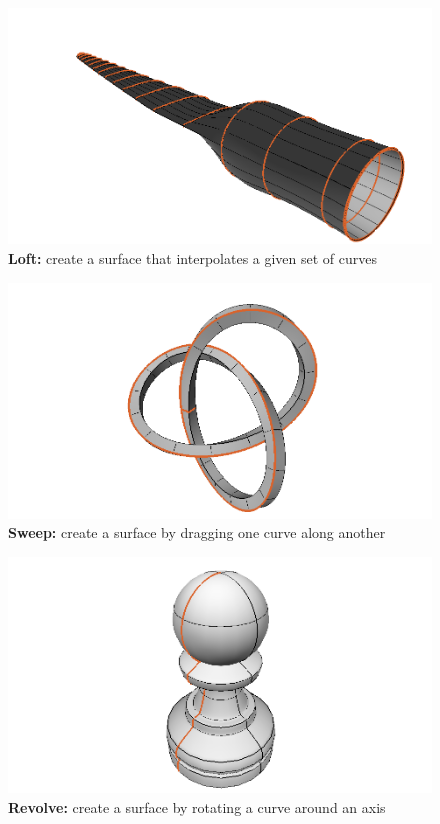 \documentclass[preprint,12pt, a4paper]{elsarticle}
\begin{document}
\begin{figure}
  \begin{center}
    \includegraphics[width=.4\textwidth]{figs/loft}
    \caption{\textbf{Loft:} create a surface that interpolates a given set of curves}
    \label{fig:loft}
  \end{center}
\end{figure}
\begin{figure}
  \begin{center}
    \includegraphics[width=.4\textwidth]{figs/sweep}
    \caption{\textbf{Sweep:} create a surface by dragging one curve along another}
    \label{fig:loft}
  \end{center}
\end{figure}
\begin{figure}
  \begin{center}
    \includegraphics[width=.4\textwidth]{figs/revolve}
    \caption{\textbf{Revolve:} create a surface by rotating a curve around an axis}
    \label{fig:loft}
  \end{center}
\end{figure}
\end{document}
